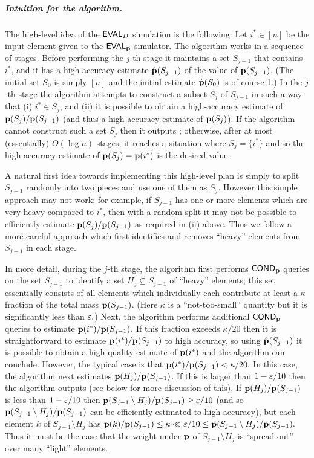 \subparagraph{Intuition for the algorithm.}
The high-level idea of the ${\sf EVAL}_D$ simulation is the
following:  Let $i^\ast \in [n]$ be the input element given to the
${\sf EVAL}_{\mathbf{p}}$ simulator.   The algorithm works in a sequence of
stages.  Before performing
the $j$-th stage it maintains a set $S_{j-1}$ that contains $i^\ast$,
and it has a high-accuracy estimate $\hat{\mathbf{p}}(S_{j-1})$ of
the value of $\mathbf{p}(S_{j-1})$.  (The initial set $S_0$ is simply $[n]$
and the initial estimate $\hat{\mathbf{p}}(S_0)$ is of course 1.)
In the $j$-th stage the algorithm attempts to construct a subset
$S_j$ of $S_{j-1}$ in such a way that (i) $i^\ast \in S_j$, and
(ii) it is possible to obtain a high-accuracy estimate of
$\mathbf{p}(S_{j})/\mathbf{p}(S_{j-1})$ (and thus a high-accuracy
estimate of $\mathbf{p}(S_{j})$).
If the algorithm cannot construct such a
set $S_j$ then it outputs \unknown; otherwise, after at most (essentially)
$O(\log n)$ stages, it reaches a situation where $S_j=\{i^\ast\}$ and
so the high-accuracy estimate of $\mathbf{p}(S_{j}) = \mathbf{p}(i^\ast)$ is the desired value.

A natural first idea towards implementing this high-level plan is
simply to split $S_{j-1}$ randomly into two pieces and use one of them
as $S_j$.  However this simple approach may not work; for example,
if $S_{j-1}$ has one or more elements which are very heavy compared to
$i^\ast$, then with a random split it may not be possible to
efficiently estimate $\mathbf{p}(S_j)/\mathbf{p}(S_{j-1})$ as required in (ii) above.
Thus we follow a more careful approach which first identifies and removes
``heavy'' elements from $S_{j-1}$ in each stage.

In more detail, during the $j$-th stage, the algorithm first performs
${\sf COND}_{\mathbf{p}}$ queries on the set $S_{j-1}$ to identify a set $H_{j}
\subseteq S_{j-1}$ of ``heavy'' elements; this set essentially consists
of all elements which individually each
contribute at least a $\kappa$ fraction of the total mass
$\mathbf{p}(S_{j-1})$.  (Here $\kappa$ is a ``not-too-small'' quantity
but it is significantly less than $\varepsilon.$)
Next, the algorithm performs additional ${\sf COND}_{\mathbf{p}}$ queries
to estimate $\mathbf{p}(i^\ast)/\mathbf{p}(S_{j-1}).$  If this fraction exceeds
$\kappa/20$ then it is straightforward to estimate
$\mathbf{p}(i^\ast)/\mathbf{p}(S_{j-1})$ to high accuracy, so using $\hat{\mathbf{p}}(S_{j-1})$ it is
possible to obtain a high-quality estimate of $\mathbf{p}(i^\ast)$
and the algorithm can conclude.  However, the typical case is
that $\mathbf{p}(i^\ast)/\mathbf{p}(S_{j-1}) < \kappa/20.$
In this case, the algorithm next estimates $\mathbf{p}(H_{j})/\mathbf{p}(S_{j-1})$.
If this is larger than $1-\varepsilon/10$ then
the algorithm outputs \unknown (see below for more discussion of this).
If $\mathbf{p}(H_{j})/\mathbf{p}(S_{j-1})$ is
less than $1-\varepsilon/10$ then $\mathbf{p}(S_{j-1} \setminus H_{j})/\mathbf{p}(S_{j-1})
\geq \varepsilon/10$ (and so $\mathbf{p}(S_{j-1} \setminus H_{j})/
\mathbf{p}(S_{j-1})$ can be efficiently estimated to high accuracy),
 but each element $k$ of $S_{j-1} \setminus H_{j}$ has
$\mathbf{p}(k)/\mathbf{p}(S_{j-1}) \leq \kappa \ll \varepsilon/10 \leq \mathbf{p}(S_{j-1} \setminus H_{j})
/\mathbf{p}(S_{j-1}).$
Thus it must be the case that the weight under $\mathbf{p}$ of
$S_{j-1} \setminus H_{j}$ is ``spread out'' over many ``light'' elements.

